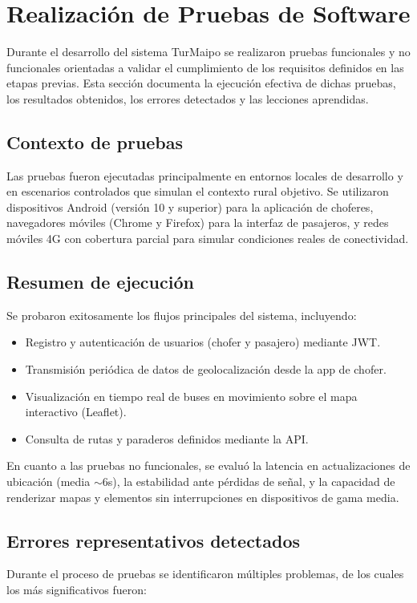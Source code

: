 \documentclass[12pt]{article}
\begin{document}
\clearpage
\section{Realización de Pruebas de Software}
Durante el desarrollo del sistema TurMaipo se realizaron pruebas funcionales y no funcionales orientadas a validar el cumplimiento de los requisitos definidos en las etapas previas. Esta sección documenta la ejecución efectiva de dichas pruebas, los resultados obtenidos, los errores detectados y las lecciones aprendidas.

\subsection{Contexto de pruebas}
Las pruebas fueron ejecutadas principalmente en entornos locales de desarrollo y en escenarios controlados que simulan el contexto rural objetivo. Se utilizaron dispositivos Android (versión 10 y superior) para la aplicación de choferes, navegadores móviles (Chrome y Firefox) para la interfaz de pasajeros, y redes móviles 4G con cobertura parcial para simular condiciones reales de conectividad. 

\subsection{Resumen de ejecución}
Se probaron exitosamente los flujos principales del sistema, incluyendo:

\begin{itemize}
    \item Registro y autenticación de usuarios (chofer y pasajero) mediante JWT.
    \item Transmisión periódica de datos de geolocalización desde la app de chofer.
    \item Visualización en tiempo real de buses en movimiento sobre el mapa interactivo (Leaflet).
    \item Consulta de rutas y paraderos definidos mediante la API.
\end{itemize}

En cuanto a las pruebas no funcionales, se evaluó la latencia en actualizaciones de ubicación (media $\sim$6s), la estabilidad ante pérdidas de señal, y la capacidad de renderizar mapas y elementos sin interrupciones en dispositivos de gama media.
\newpage
\subsection{Errores representativos detectados}
Durante el proceso de pruebas se identificaron múltiples problemas, de los cuales los más significativos fueron:
\end{document}
